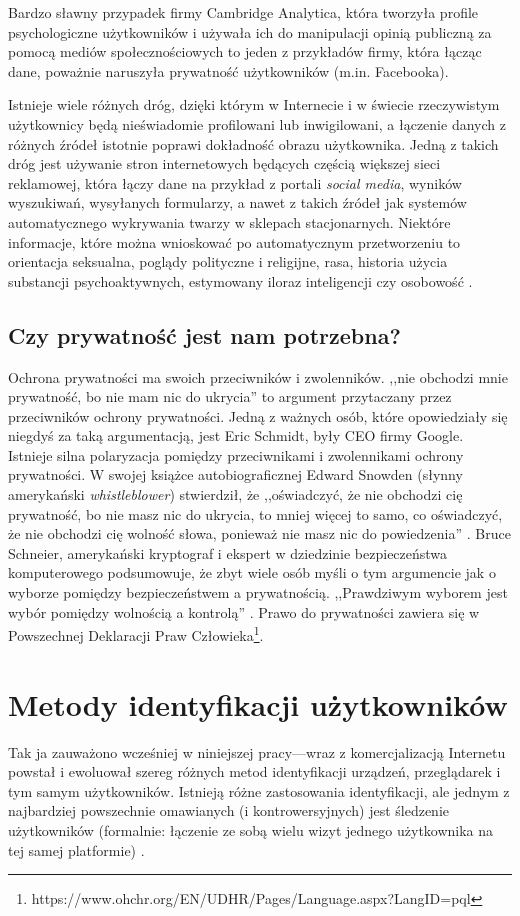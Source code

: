 Bardzo sławny przypadek firmy Cambridge Analytica, która tworzyła profile
psychologiczne użytkowników i używała ich do manipulacji opinią publiczną za
pomocą mediów społecznościowych to jeden z przykładów firmy, która łącząc dane,
poważnie naruszyła prywatność użytkowników (m.in. Facebooka).

Istnieje wiele różnych dróg, dzięki którym w Internecie i w świecie rzeczywistym
użytkownicy będą nieświadomie profilowani lub inwigilowani, a łączenie danych z
różnych źródeł istotnie poprawi dokładność obrazu użytkownika. Jedną z takich
dróg jest używanie stron internetowych będących częścią większej sieci
reklamowej, która łączy dane na przykład z portali \emph{social media}, wyników
wyszukiwań, wysyłanych formularzy, a nawet z takich źródeł jak systemów
automatycznego wykrywania twarzy w sklepach stacjonarnych. Niektóre informacje,
które można wnioskować po automatycznym przetworzeniu to orientacja seksualna,
poglądy polityczne i religijne, rasa, historia użycia substancji
psychoaktywnych, estymowany iloraz inteligencji czy osobowość
\cite{kosinski2013private}.

\subsection{Czy prywatność jest nam potrzebna?}
Ochrona prywatności ma swoich przeciwników i zwolenników. ,,nie obchodzi mnie
prywatność, bo nie mam nic do ukrycia'' to argument przytaczany przez
przeciwników ochrony prywatności. Jedną z ważnych osób, które opowiedziały się
niegdyś za taką argumentacją, jest Eric Schmidt, były CEO firmy Google. Istnieje
silna polaryzacja pomiędzy przeciwnikami i zwolennikami ochrony prywatności. W
swojej książce autobiograficznej Edward Snowden (słynny amerykański
\emph{whistleblower}) stwierdził, że ,,oświadczyć, że nie obchodzi cię
prywatność, bo nie masz nic do ukrycia, to mniej więcej to samo, co oświadczyć,
że nie obchodzi cię wolność słowa, ponieważ nie masz nic do powiedzenia''
\cite{snowden2019pamiec}. Bruce Schneier, amerykański kryptograf i ekspert w
dziedzinie bezpieczeństwa komputerowego podsumowuje, że zbyt wiele osób myśli o
tym argumencie jak o wyborze pomiędzy bezpieczeństwem a prywatnością.
,,Prawdziwym wyborem jest wybór pomiędzy wolnością a kontrolą''
\cite{schneier2006eternal}. Prawo do prywatności zawiera się w Powszechnej
Deklaracji Praw
Człowieka\footnote{https://www.ohchr.org/EN/UDHR/Pages/Language.aspx?LangID=pql}.

\section{Metody identyfikacji użytkowników}
Tak ja zauważono wcześniej w niniejszej pracy---wraz z komercjalizacją Internetu
powstał i ewoluował szereg różnych metod identyfikacji urządzeń, przeglądarek i
tym samym użytkowników. Istnieją różne zastosowania identyfikacji, ale jednym z
najbardziej powszechnie omawianych (i kontrowersyjnych) jest śledzenie
użytkowników (formalnie: łączenie ze sobą wielu wizyt jednego użytkownika na tej
samej platformie) \cite[s. 3]{al2020too}.

